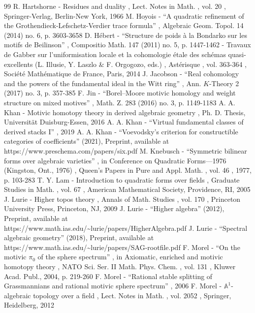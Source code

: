 \documentclass[11pt]{article}
\numberwithin{equation}{section}\renewcommand{\encodingdefault}{TU}
\begin{document}
\begin{thebibliography}{99}
 R. Hartshorne - Residues and duality , Lect. Notes in Math. , vol. 20 , Springer-Verlag, Berlin-New York, 1966
 M. Hoyois - “A quadratic refinement of the Grothendieck-Lefschetz-Verdier trace formula” , Algebraic Geom. Topol. 14 (2014) no. 6, p. 3603-3658
 D. Hébert - “Structure de poids à la Bondarko sur les motifs de Beilinson” , Compositio Math. 147 (2011) no. 5, p. 1447-1462
 - Travaux de Gabber sur l’uniformisation locale et la cohomologie étale des schémas quasi-excellents (L. Illusie, Y. Laszlo \& F. Orgogozo, eds.) , Astérisque , vol. 363-364 , Société Mathématique de France, Paris, 2014
 J. Jacobson - “Real cohomology and the powers of the fundamental ideal in the Witt ring” , Ann. $K$-Theory 2 (2017) no. 3, p. 357-385
 F. Jin - “Borel–Moore motivic homology and weight structure on mixed motives” , Math. Z. 283 (2016) no. 3, p. 1149-1183
 A. A. Khan - Motivic homotopy theory in derived algebraic geometry , Ph. D. Thesis, Universität Duisburg-Essen, 2016
 A. A. Khan - “Virtual fundamental classes of derived stacks I” , 2019
 A. A. Khan - “Voevodsky’s criterion for constructible categories of coefficients” (2021), Preprint, available at https://www.preschema.com/papers/six.pdf
 M. Knebusch - “Symmetric bilinear forms over algebraic varieties” , in Conference on Quadratic Forms—1976 (Kingston, Ont., 1976) , Queen’s Papers in Pure and Appl. Math. , vol. 46 , 1977, p. 103-283
 T. Y. Lam - Introduction to quadratic forms over fields , Graduate Studies in Math. , vol. 67 , American Mathematical Society, Providence, RI, 2005
 J. Lurie - Higher topos theory , Annals of Math. Studies , vol. 170 , Princeton University Press, Princeton, NJ, 2009
 J. Lurie - “Higher algebra” (2012), Preprint, available at https://www.math.ias.edu/\textasciitilde{}lurie/papers/HigherAlgebra.pdf
 J. Lurie - “Spectral algebraic geometry” (2018), Preprint, available at https://www.math.ias.edu/\textasciitilde{}lurie/papers/SAG-rootfile.pdf
 F. Morel - “On the motivic $\pi _0$ of the sphere spectrum” , in Axiomatic, enriched and motivic homotopy theory , NATO Sci. Ser. II Math. Phys. Chem. , vol. 131 , Kluwer Acad. Publ., 2004, p. 219-260
 F. Morel - “Rational stable splitting of Grassmannians and rational motivic sphere spectrum” , 2006
 F. Morel - $\mathbb{A}^1$-algebraic topology over a field , Lect. Notes in Math. , vol. 2052 , Springer, Heidelberg, 2012

\end{thebibliography}
\end{document}
